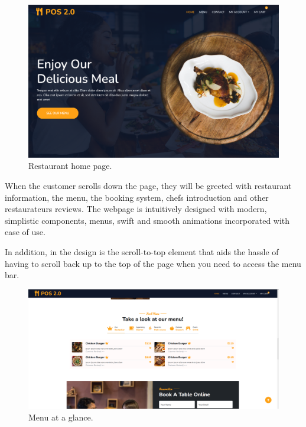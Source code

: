 \documentclass[12pt, a4paper]{article}
\theoremstyle{styleth}
\theoremstyle{styledef}
\begin{document}
\begin{figure}[H]
	\centering
	\includegraphics[width=16cm]{Screenshot 2022-05-01 000318.png}
	\caption{Restaurant home page.}
	\label{fig:index}
\end{figure}

When the customer scrolls down the page, they will be greeted with restaurant information, the menu, the booking system, chefs introduction and other restaurateurs reviews. The webpage is intuitively designed with modern, simplistic components, menus, swift and smooth animations incorporated with ease of use.

\vspace{5mm}
In addition, in the design is the scroll-to-top element that aids the hassle of having to scroll back up to the top of the page when you need to access the menu bar.

\begin{figure}[H]
	\centering
	\includegraphics[width=16cm]{Screenshot 2022-05-01 002849.png}
	\caption{Menu at a glance.}
	\label{fig:menus}
\end{figure}
\end{document}
